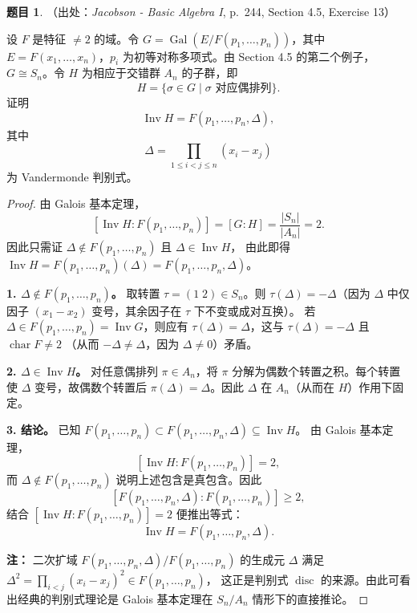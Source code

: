\documentclass[a4paper]{ctexart}
\theoremstyle{definition}
\newtheorem{example}{题目}[section]
\theoremstyle{analysis}
\theoremstyle{plain}
\begin{document}
\begin{example}
（出处：\textit{Jacobson - Basic Algebra I}, p.~244, Section 4.5, Exercise 13）

设 \(F\) 是特征 \(\neq2\) 的域。令 \(G=\operatorname{Gal}(E/F(p_1,\ldots,p_n))\)，其中
\(E=F(x_1,\ldots,x_n)\)，\(p_i\) 为初等对称多项式。由 Section 4.5 的第二个例子，
\(G\cong S_n\)。令 \(H\) 为相应于交错群 \(A_n\) 的子群，即
\[
  H=\{\sigma\in G\mid \sigma\text{ 对应偶排列}\}.
\]
证明
\[
  \operatorname{Inv}H=F(p_1,\ldots,p_n,\Delta),
\]
其中
\[
  \Delta=\prod_{1\le i<j\le n}(x_i-x_j)
\]
为 Vandermonde 判别式。

\begin{proof}
由 Galois 基本定理，
\[
  [\operatorname{Inv}H:F(p_1,\ldots,p_n)]=[G:H]=\frac{|S_n|}{|A_n|}=2.
\]
因此只需证 \(\Delta\notin F(p_1,\ldots,p_n)\) 且 \(\Delta\in\operatorname{Inv}H\)，
由此即得 \(\operatorname{Inv}H=F(p_1,\ldots,p_n)(\Delta)=F(p_1,\ldots,p_n,\Delta)\)。

\textbf{1. \(\Delta\notin F(p_1,\ldots,p_n)\)。}
取转置 \(\tau=(1\;2)\in S_n\)。则 \(\tau(\Delta)=-\Delta\)（因为 \(\Delta\) 中仅
因子 \((x_1-x_2)\) 变号，其余因子在 \(\tau\) 下不变或成对互换）。
若 \(\Delta\in F(p_1,\ldots,p_n)=\operatorname{Inv}G\)，则应有
\(\tau(\Delta)=\Delta\)，这与 \(\tau(\Delta)=-\Delta\) 且 \(\operatorname{char}F\neq2\)
（从而 \(-\Delta\neq\Delta\)，因为 \(\Delta\neq0\)）矛盾。

\textbf{2. \(\Delta\in\operatorname{Inv}H\)。}
对任意偶排列 \(\pi\in A_n\)，将 \(\pi\) 分解为偶数个转置之积。每个转置使
\(\Delta\) 变号，故偶数个转置后 \(\pi(\Delta)=\Delta\)。因此
\(\Delta\) 在 \(A_n\)（从而在 \(H\)）作用下固定。

\textbf{3. 结论。}
已知 \(F(p_1,\ldots,p_n)\subset F(p_1,\ldots,p_n,\Delta)\subseteq\operatorname{Inv}H\)。
由 Galois 基本定理，
\[
  [\operatorname{Inv}H:F(p_1,\ldots,p_n)]=2,
\]
而 \(\Delta\notin F(p_1,\ldots,p_n)\) 说明上述包含是真包含。因此
\[
  [F(p_1,\ldots,p_n,\Delta):F(p_1,\ldots,p_n)]\ge2,
\]
结合 \([\operatorname{Inv}H:F(p_1,\ldots,p_n)]=2\) 便推出等式：
\[
  \operatorname{Inv}H=F(p_1,\ldots,p_n,\Delta).
\]

\textbf{注：} 二次扩域 \(F(p_1,\ldots,p_n,\Delta)/F(p_1,\ldots,p_n)\) 的生成元
\(\Delta\) 满足 \(\Delta^2=\prod_{i<j}(x_i-x_j)^2\in F(p_1,\ldots,p_n)\)，
这正是判别式 \(\operatorname{disc}\) 的来源。由此可看出经典的判别式理论是
Galois 基本定理在 \(S_n/A_n\) 情形下的直接推论。
\end{proof}
\end{example}
\end{document}
